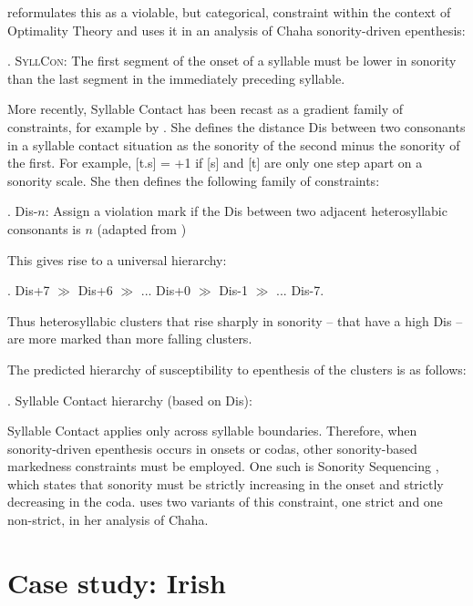 \documentclass[12pt]{article}
\begin{document}
\citet{rose.2000} reformulates this as a violable, but categorical, constraint within the context of Optimality Theory and uses it in an analysis of Chaha sonority-driven epenthesis:

\ex.  \textsc{SyllCon}: The first segment of the onset of a syllable must be lower in sonority than the last segment in the immediately preceding syllable.

More recently, Syllable Contact has been recast as a gradient family of constraints, for example by \citet{gouskova.2002, gouskova.2004}.  She defines the distance {\sc Dis} between two consonants in a syllable contact situation as the sonority of the second minus the sonority of the first.  For example, [t.s] = +1 if [s] and [t] are only one step apart on a sonority scale.  She then defines the following family of constraints:

\ex. {\sc *Dis-}$n$: Assign a violation mark if the {\sc Dis} between two adjacent heterosyllabic consonants is $n$ (adapted from \citep{gouskova.2002})

This gives rise to a universal hierarchy:

\ex. {\sc *Dis+7} $\gg$ {\sc *Dis+6} $\gg$ ... {\sc *Dis+0} $\gg$ {\sc *Dis-1} $\gg$ ... {\sc *Dis-7}.

Thus heterosyllabic clusters that rise sharply in sonority -- that have a high {\sc Dis} -- are more marked than more falling clusters.

The predicted hierarchy of susceptibility to epenthesis of the clusters is as follows:

\ex. Syllable Contact hierarchy (based on {\sc *Dis}):

\vspace{-3em}
\noindent \resizebox{\linewidth}{!}{\usebox{\syllablecontacthierarchy}}

\bigskip

Syllable Contact applies only across syllable boundaries.  Therefore, when sonority-driven epenthesis occurs in onsets or codas, other sonority-based markedness constraints must be employed.  One such is {\sc Sonority Sequencing} \citep{selkirk.1984}, which states that sonority must be strictly increasing in the onset and strictly decreasing in the coda. \citep{rose.2000} uses two variants of this constraint, one strict and one non-strict, in her analysis of Chaha.

\section{Case study: Irish} \label{irish}
\end{document}
